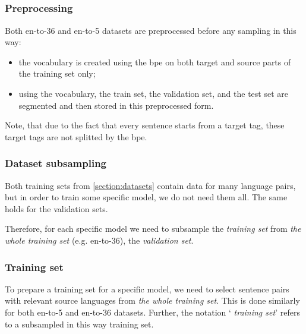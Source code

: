 

\subsection{}
\label{section:data_selection}
\label{section:data_preprocessing}

\subsubsection*{Preprocessing}
	Both en-to-36 and en-to-5 datasets
are preprocessed before any sampling in this way:
\begin{itemize}
	\item the vocabulary is created using the \acrshort{bpe}
		on both target and source parts of the training set only;
	\item using the vocabulary, the train set, the validation
		set, and the test set are segmented and then stored
		in this preprocessed form.
\end{itemize}

Note, that due to the fact that every sentence starts from a
target tag, these target tags are not splitted by the \acrshort{bpe}.

\subsubsection*{Dataset subsampling}

Both training sets from \cref{section:datasets} contain data for
many language pairs, but in order to train some specific model,
we do not need them all.
The same holds for the validation sets.

Therefore, for each specific model 
we need to subsample the \emph{ training set}
from \emph{the whole training set} (e.g. \gls{en-to-36}),
the \emph{ validation set}.



\subsubsection*{Training set}

To prepare a training set for a specific model, we need to select
sentence pairs with relevant source languages from
\emph{the whole training set}.
This is done similarly for both \gls{en-to-5} and \gls{en-to-36}
datasets.
Further, the notation `\emph{ training set}'
refers to a subsampled in this way training set.

